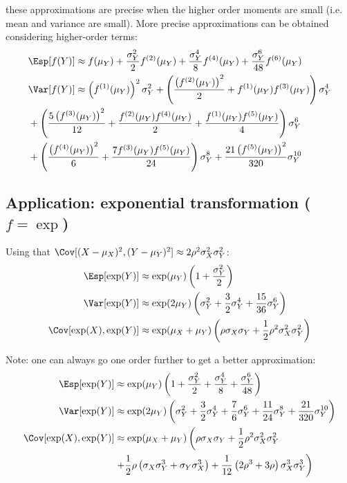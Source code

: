 \documentclass[12pt]{article}
\newcommand\Warning[1][3ex]{%
\renewcommand\stacktype{L}%
\scaleto{\stackon[1.3pt]{\color{red}$\triangle$}{\tiny\bfseries !}}{#1}%
\xspace
}
\begin{document}
\Warning these approximations are precise when the higher order
moments are small (i.e. mean and variance are small). More precise
approximations can be obtained considering higher-order terms:
\begin{align*}
&\Esp[f(Y)] \approx f(\mu_Y) + \frac{\sigma_Y^2}{2} f^{(2)}(\mu_Y)  + \frac{\sigma_Y^4}{8} f^{(4)}(\mu_Y) + \frac{\sigma_Y^6}{48} f^{(6)}(\mu_Y) \\
&\Var[f(Y)] \approx \left(f^{(1)}(\mu_Y)\right)^2 \sigma_Y^2 + \left(\frac{\left(f^{(2)}(\mu_Y)\right)^2}{2} + f^{(1)}(\mu_Y)f^{(3)}(\mu_Y)\right) \sigma_Y^4 \\
                  &+ \left(\frac{5\left(f^{(3)}(\mu_Y)\right)^2}{12} + \frac{f^{(2)}(\mu_Y)f^{(4)}(\mu_Y)}{2}  + \frac{f^{(1)}(\mu_Y)f^{(5)}(\mu_Y)}{4} \right) \sigma_Y^6  \\
                  &+ \left(\frac{\left(f^{(4)}(\mu_Y)\right)^2}{6} + \frac{7 f^{(3)}(\mu_Y)f^{(5)}(\mu_Y)}{24} \right) \sigma_Y^8 + \frac{21\left(f^{(5)}(\mu_Y)\right)^2}{320} \sigma_Y^{10}
\end{align*}

\clearpage

\subsection{Application:  exponential transformation (\(f = \exp\))}
\label{SM:exptrans}
Using that \(\Cov[(X-\mu_X)^2,(Y-\mu_Y)^2]\approx2 \rho^2 \sigma_X^2 \sigma_Y^2\):
\begin{align*}
\Esp[\exp(Y)] &\approx \exp(\mu_Y)\left(1 + \frac{\sigma_Y^2}{2}\right) \\
\Var[\exp(Y)] &\approx \exp(2\mu_Y)\left(\sigma_Y^2 + \frac{3}{2} \sigma_Y^4 + \frac{15}{36} \sigma_Y^6 \right)\\
\Cov[\exp(X),\exp(Y)] &\approx \exp(\mu_X+\mu_Y)\left(\rho \sigma_X \sigma_Y + \frac{1}{2} \rho^2 \sigma_X^2 \sigma_Y^2\right) 
\end{align*}

Note: one can always go one order further to get a better approximation:
\begin{align*}
\Esp[\exp(Y)] &\approx \exp(\mu_Y)\left(1 + \frac{\sigma_Y^2}{2}+\frac{\sigma_Y^4}{8}+\frac{\sigma_Y^6}{48}\right) \\
\Var[\exp(Y)] &\approx \exp(2\mu_Y)\left(\sigma_Y^2 + \frac{3}{2} \sigma_Y^4 + \frac{7}{6} \sigma_Y^6 + \frac{11}{24} \sigma_Y^8 + \frac{21}{320} \sigma_Y^{10}\right) \\
\Cov[\exp(X),\exp(Y)] &\approx \exp(\mu_X+\mu_Y)\left(\rho \sigma_X \sigma_Y + \frac{1}{2} \rho^2 \sigma_X^2 \sigma_Y^2 \right.\\
& \left. + \frac{1}{2} \rho \left(\sigma_X \sigma_Y^3 + \sigma_Y \sigma_X^3 \right) + \frac{1}{12} \left(2 \rho^3 + 3 \rho\right) \sigma_X^3 \sigma_Y^3 \right)
\end{align*}
\end{document}
